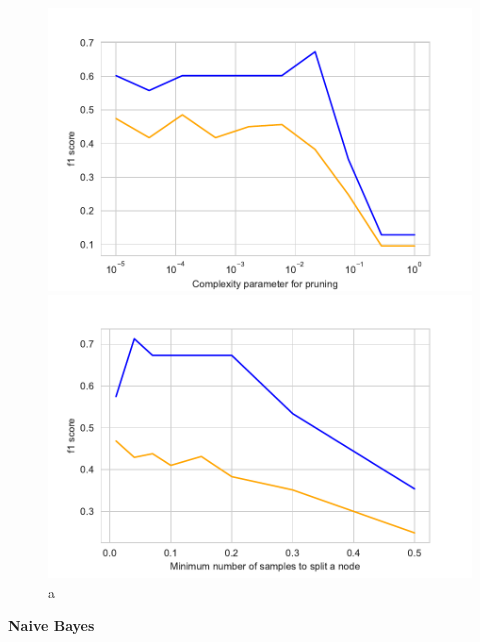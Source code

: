 \documentclass[11pt]{article}
\begin{document}
\begin{figure}[h]
\begin{minipage}[l]{0.33\textwidth}
\end{minipage}
\begin{minipage}[l]{0.33\textwidth}
\includegraphics[width=1\linewidth]{bridges/ccp_alpha_rdf.pdf}
\end{minipage}
\begin{minipage}[l]{0.33\textwidth}
\includegraphics[width=1\linewidth]{bridges/min_samples_split_rdf.pdf}
\end{minipage}
\caption{a}
\label{Fig::RDF_result_manual parameter_tuning}
\end{figure}
\textbf{Naive Bayes}
%
\end{document}
